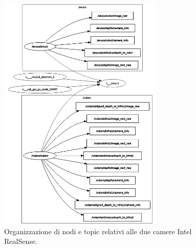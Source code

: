 \begin{figure}
    \centering
    \includegraphics[width=0.7\textwidth]{figs/chapter3/cameranodes.png}
    \caption{Organizzazione di nodi e topic relativi alle due camere Intel RealSense.}
    \label{fig:cameranodes}
\end{figure}

